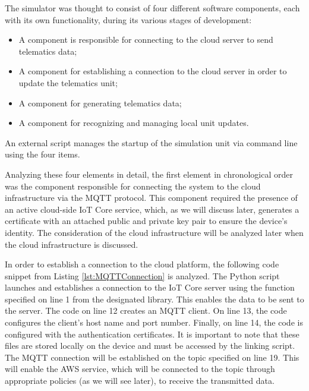 The simulator was thought to consist of four different software components, each with its own functionality, during its various stages of development:
\begin{itemize}
    \item A component is responsible for connecting to the cloud server to send telematics data;
    \item A component for establishing a connection to the cloud server in order to update the telematics unit;
    \item A component for generating telematics data;
    \item A component for recognizing and managing local unit updates.
\end{itemize}
An external script manages the startup of the simulation unit via command line using the four items. 

Analyzing these four elements in detail, the first element in chronological order was the component responsible for connecting the system to the cloud infrastructure via the MQTT protocol. This component required the presence of an active cloud-side IoT Core service, which, as we will discuss later, generates a certificate with an attached public and private key pair to ensure the device's identity. The consideration of the cloud infrastructure will be analyzed later when the cloud infrastructure is discussed.

In order to establish a connection to the cloud platform, the following code snippet from Listing \ref{lst:MQTTConnection} is analyzed. The Python script launches and establishes a connection to the IoT Core server using the function specified on line 1 from the designated library. This enables the data to be sent to the server. The code on line 12 creates an MQTT client. On line 13, the code configures the client's host name and port number. Finally, on line 14, the code is configured with the authentication certificates. It is important to note that these files are stored locally on the device and must be accessed by the linking script. The MQTT connection will be established on the topic specified on line 19. This will enable the AWS service, which will be connected to the topic through appropriate policies (as we will see later), to receive the transmitted data.

